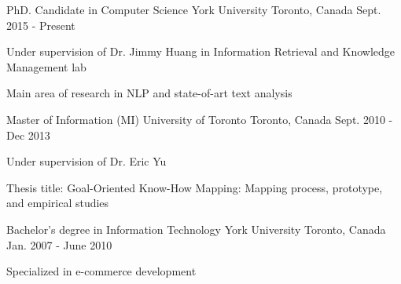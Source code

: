 \vspace{-0.5em}
\begin{cventries}
  \cventry
    {PhD. Candidate in Computer Science}
    {York University}
    {Toronto, Canada}
    {Sept. 2015 - Present}
    {
      \begin{cvitems}
        \item {Under supervision of Dr. Jimmy Huang in Information Retrieval and Knowledge Management lab}
        \item{Main area of research in NLP and state-of-art text analysis}
      \end{cvitems}
    }
  \cventry
    {Master of Information (MI)}
    {University of Toronto}
    {Toronto, Canada}
    {Sept. 2010 - Dec 2013}
    {
      \begin{cvitems}
      	\item{Under supervision of Dr. Eric Yu}
        \item{Thesis title: Goal-Oriented Know-How Mapping: Mapping process, prototype, and empirical studies}
      \end{cvitems}
    }
  \cventry
    {Bachelor's degree in Information Technology}
    {York University}
    {Toronto, Canada}
    {Jan. 2007 - June 2010}
    {
      \begin{cvitems}
        \item {Specialized in e-commerce development}
      \end{cvitems}
    }
    \vspace{-1em}
\end{cventries}
